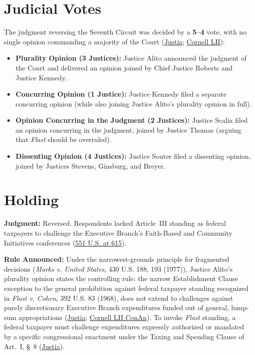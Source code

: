 \documentclass[12pt]{article}
\begin{document}
\section{Judicial Votes}

The judgment reversing the Seventh Circuit was decided by a \textbf{5--4} vote, with no single opinion commanding a majority of the Court (\href{https://supreme.justia.com/cases/federal/us/551/587/}{Justia}; \href{https://www.law.cornell.edu/supct/html/06-157.ZS.html}{Cornell LII}):

\begin{itemize}
    \item \textbf{Plurality Opinion (3 Justices):} Justice Alito announced the judgment of the Court and delivered an opinion joined by Chief Justice Roberts and Justice Kennedy.
    \item \textbf{Concurring Opinion (1 Justice):} Justice Kennedy filed a separate concurring opinion (while also joining Justice Alito's plurality opinion in full).
    \item \textbf{Opinion Concurring in the Judgment (2 Justices):} Justice Scalia filed an opinion concurring in the judgment, joined by Justice Thomas (arguing that \textit{Flast} should be overruled).
    \item \textbf{Dissenting Opinion (4 Justices):} Justice Souter filed a dissenting opinion, joined by Justices Stevens, Ginsburg, and Breyer.
\end{itemize}

\section{Holding}

\textbf{Judgment:} Reversed. Respondents lacked Article~III standing as federal taxpayers to challenge the Executive Branch's Faith-Based and Community Initiatives conferences (\href{https://supreme.justia.com/cases/federal/us/551/587/}{551 U.S. at 615}).

\textbf{Rule Announced:} Under the narrowest-grounds principle for fragmented decisions (\textit{Marks v. United States}, 430 U.S. 188, 193 (1977)), Justice Alito's plurality opinion states the controlling rule: the narrow Establishment Clause exception to the general prohibition against federal taxpayer standing recognized in \textit{Flast v. Cohen}, 392 U.S. 83 (1968), does not extend to challenges against purely discretionary Executive Branch expenditures funded out of general, lump-sum appropriations (\href{https://supreme.justia.com/cases/federal/us/551/587/}{Justia}; \href{https://www.law.cornell.edu/constitution-conan/article-3/section-2/clause-1/taxpayer-standing}{Cornell LII ConAn}). To invoke \textit{Flast} standing, a federal taxpayer must challenge expenditures expressly authorized or mandated by a specific congressional enactment under the Taxing and Spending Clause of Art.~I, \S~8 (\href{https://supreme.justia.com/cases/federal/us/551/587/}{Justia}).
\end{document}
